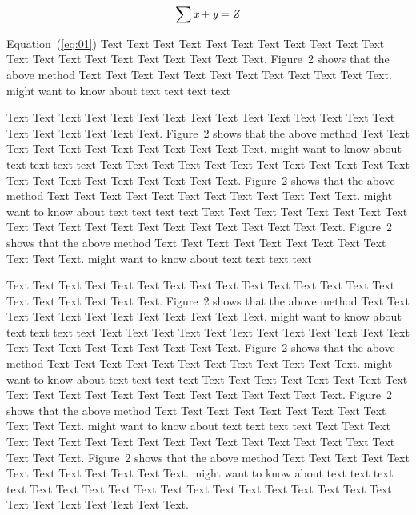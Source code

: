 \documentclass{bioinfo}
\begin{document}
\begin{equation}
\sum \text{\it x}+ \text{\it y} =\text{\it Z}
\label{eq:01}
\end{equation}

Equation~(\ref{eq:01}) Text Text Text Text Text Text  Text Text
Text Text Text Text Text Text Text Text Text Text Text Text Text.
Figure~2\vphantom{\ref{nextstrain}} shows that the above method  Text
Text Text Text  Text Text Text Text Text Text  Text Text.
\citealp{neher2015nextflu} might want to know about text text text text

Text Text Text Text Text Text  Text Text Text Text Text Text Text
Text Text  Text Text Text Text Text Text.
Figure~2\vphantom{\ref{nextstrain}} shows that the above method  Text
Text Text Text  Text Text Text Text Text Text  Text Text.
\citealp{neher2015nextflu} might want to know about  text text text text
Text Text Text Text Text Text Text Text Text Text Text Text Text
Text Text  Text Text Text Text Text Text.
Figure~2\vphantom{\ref{nextstrain}} shows that the above method  Text
Text Text Text Text Text Text Text Text Text  Text Text.
\citealp{neher2015nextflu} might want to know about text text text text
Text Text Text Text Text Text  Text Text Text Text Text Text Text
Text Text Text Text Text Text Text Text.
Figure~2\vphantom{\ref{nextstrain}} shows that the above method  Text
Text Text Text Text Text Text Text Text Text  Text Text.
\citealp{neher2015nextflu} might want to know about text text text
text

Text Text Text Text Text Text  Text Text Text Text Text Text Text
Text Text  Text Text Text Text Text Text.
Figure~2\vphantom{\ref{nextstrain}} shows that the above method  Text
Text Text Text  Text Text Text Text Text Text  Text Text.
\citealp{neher2015nextflu} might want to know about  text text text text
Text Text Text Text Text Text Text Text Text Text Text Text Text
Text Text Text Text Text Text Text Text.
Figure~2\vphantom{\ref{nextstrain}} shows that the above method  Text
Text Text Text Text Text Text Text Text Text  Text Text.
\citealp{neher2015nextflu} might want to know about text text text text
Text Text Text Text Text Text  Text Text Text Text Text Text Text
Text Text Text Text Text Text Text Text.
Figure~2\vphantom{\ref{nextstrain}} shows that the above method  Text
Text Text Text Text Text Text Text Text Text  Text Text.
\citealp{neher2015nextflu} might want to know about text text text text
Text Text Text Text Text Text  Text Text Text Text Text Text Text
Text Text Text Text Text Text Text Text.
Figure~2\vphantom{\ref{nextstrain}} shows that the above method Text
Text Text Text Text Text Text Text Text Text Text Text.
\citealp{neher2015nextflu} might want to know about text text text text
Text Text Text Text Text Text  Text Text Text Text Text Text Text
Text Text Text Text Text Text Text Text.
\end{document}
